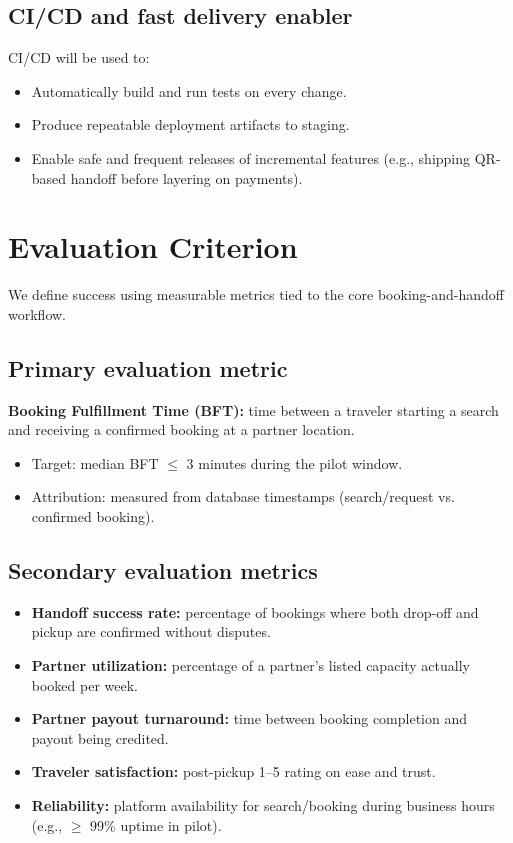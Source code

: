 \documentclass[11pt,a4paper]{article}
\begin{document}
\subsection{CI/CD and fast delivery enabler}
CI/CD will be used to:
\begin{itemize}[leftmargin=0.7cm]
    \item Automatically build and run tests on every change.
    \item Produce repeatable deployment artifacts to staging.
    \item Enable safe and frequent releases of incremental features (e.g., shipping QR-based handoff before layering on payments).
\end{itemize}

\section{Evaluation Criterion}
We define success using measurable metrics tied to the core booking-and-handoff workflow.

\subsection{Primary evaluation metric}
\textbf{Booking Fulfillment Time (BFT):} time between a traveler starting a search and receiving a confirmed booking at a partner location.
\begin{itemize}[leftmargin=0.7cm]
    \item Target: median BFT $\le$ 3 minutes during the pilot window.
    \item Attribution: measured from database timestamps (search/request vs. confirmed booking).
\end{itemize}

\subsection{Secondary evaluation metrics}
\begin{itemize}[leftmargin=0.7cm]
    \item \textbf{Handoff success rate:} percentage of bookings where both drop-off and pickup are confirmed without disputes.
    \item \textbf{Partner utilization:} percentage of a partner's listed capacity actually booked per week.
    \item \textbf{Partner payout turnaround:} time between booking completion and payout being credited.
    \item \textbf{Traveler satisfaction:} post-pickup 1--5 rating on ease and trust.
    \item \textbf{Reliability:} platform availability for search/booking during business hours (e.g., $\ge$ 99\% uptime in pilot).
\end{itemize}
\end{document}
